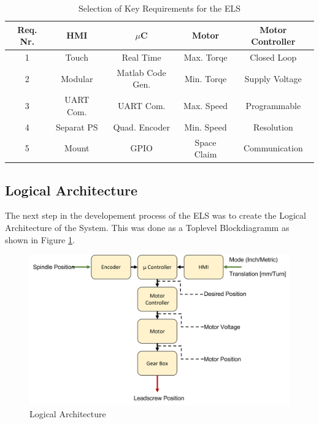 \begin{table}
    \centering
     \begin{tabular}{||c|c|c|c|c||} 
        \hline
        Req. Nr. & HMI & $\mu$C & Motor & Motor Controller \\ [0.5ex] 
        \hline\hline
        1 & Touch       & Real Time         &  Max. Torqe   & Closed Loop   \\ 
        2 & Modular     & Matlab Code Gen.  &  Min. Torqe   & Supply Voltage\\
        3 & UART Com.   & UART Com.         &  Max. Speed   & Programmable  \\
        4 & Separat PS  & Quad. Encoder     &  Min. Speed   & Resolution    \\
        5 & Mount       & GPIO              &  Space Claim  & Communication \\ [1ex] 
        \hline
     \end{tabular}
     \caption{Selection of Key Requirements for the ELS}
     \label{Tab Key Requirements}
\end{table}




\subsection{Logical Architecture}

The next step in the developement process of the ELS was to create the Logical Architecture of the System. This was done as a Toplevel Blockdiagramm as shown in Figure \ref{Logical Architecture}.

\begin{figure}[h!]
    \begin{center}
    \includegraphics[width=12cm]{Pictures/Logical Architecture.png}
    \caption[Logical Architecture]{Logical Architecture}
    \label{Logical Architecture}
    \end{center}
\end{figure}

